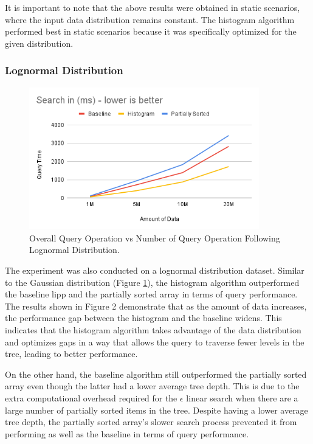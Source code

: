 It is important to note that the above results were obtained in static scenarios, where the input data distribution remains constant. The histogram algorithm performed best in static scenarios because it was specifically optimized for the given distribution. 

\subsubsection{Lognormal Distribution}
\begin{figure}[H]
    \centering
    \includegraphics[width=100mm,scale=1]{Figures/QueryLognormal.png}
    \caption{
     Overall Query Operation vs Number of Query Operation Following Lognormal Distribution.
    }
    \label{fig:QueryResultLognormal}
\end{figure}
The experiment was also conducted on a lognormal distribution dataset. Similar to the Gaussian distribution (Figure \ref{fig:QueryResultLognormal}), the histogram algorithm outperformed the baseline \acrshort{lipp} and the partially sorted array in terms of query performance. The results shown in Figure 2 demonstrate that as the amount of data increases, the performance gap between the histogram and the baseline widens. This indicates that the histogram algorithm takes advantage of the data distribution and optimizes gaps in a way that allows the query to traverse fewer levels in the tree, leading to better performance.

On the other hand, the baseline algorithm still outperformed the partially sorted array even though the latter had a lower average tree depth. This is due to the extra computational overhead required for the $\epsilon$ linear search when there are a large number of partially sorted items in the tree. Despite having a lower average tree depth, the partially sorted array's slower search process prevented it from performing as well as the baseline in terms of query performance.

